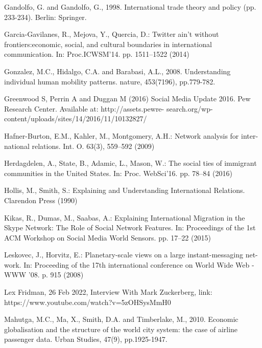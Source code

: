 \documentclass[12pt]{article}
\begin{document}
Gandolfo, G. and Gandolfo, G., 1998. International trade theory and policy (pp. 233-234). Berlin: Springer.
\newline

Garcia-Gavilanes, R., Mejova, Y., Quercia, D.: Twitter ain’t without frontiers:economic, social, and cultural boundaries in international communication. In: Proc.ICWSM’14. pp. 1511–1522 (2014)
\newline

Gonzalez, M.C., Hidalgo, C.A. and Barabasi, A.L., 2008. Understanding individual human mobility patterns. nature, 453(7196), pp.779-782.
\newline

Greenwood S, Perrin A and Duggan M (2016) Social Media Update 2016. Pew Research Center. Available at: http://assets.pewre- search.org/wp-content/uploads/sites/14/2016/11/10132827/
\newline

Hafner-Burton, E.M., Kahler, M., Montgomery, A.H.: Network analysis for inter- national relations. Int. O. 63(3), 559–592 (2009)
\newline

Herdagdelen, A., State, B., Adamic, L., Mason, W.: The social ties of immigrant communities in the United States. In: Proc. WebSci’16. pp. 78–84 (2016)
\newline

Hollis, M., Smith, S.: Explaining and Understanding International Relations. Clarendon Press (1990)
\newline

Kikas, R., Dumas, M., Saabas, A.: Explaining International Migration in the Skype Network: The Role of Social Network Features. In: Proceedings of the 1st ACM Workshop on Social Media World Sensors. pp. 17–22 (2015)
\newline

Leskovec, J., Horvitz, E.: Planetary-scale views on a large instant-messaging net-work. In: Proceeding of the 17th international conference on World Wide Web -WWW ’08. p. 915 (2008)
\newline

Lex Fridman, 26 Feb 2022, Interview With Mark Zuckerberg, link: https://www.youtube.com/watch?v=5zOHSysMmH0
\newline

Mahutga, M.C., Ma, X., Smith, D.A. and Timberlake, M., 2010. Economic globalisation and the structure of the world city system: the case of airline passenger data. Urban Studies, 47(9), pp.1925-1947.
\newline
\end{document}
